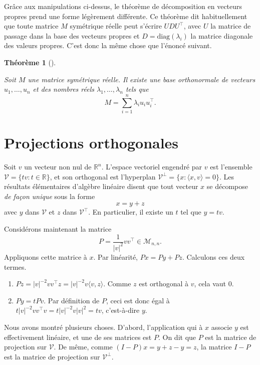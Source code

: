 \documentclass[
  10,
  letterpaper,
  DIV=11,
  numbers=noendperiod]{scrreport}
\providecommand{\tightlist}{%
  \setlength{\itemsep}{0pt}\setlength{\parskip}{0pt}}\usepackage{longtable,booktabs,array}
\theoremstyle{plain}
\newtheorem{theorem}{Théorème}[chapter]
\theoremstyle{definition}
\theoremstyle{plain}
\theoremstyle{definition}
\theoremstyle{definition}
\theoremstyle{plain}
\theoremstyle{remark}
\begin{document}
Grâce aux manipulations ci-dessus, le théorème de décomposition en
vecteurs propres prend une forme légèrement différente. Ce théorème dit
habituellement que toute matrice \(M\) symétrique réelle peut s'écrire
\(UDU^\top\), avec \(U\) la matrice de passage dans la base des vecteurs
propres et \(D = \mathrm{diag}(\lambda_i)\) la matrice diagonale des
valeurs propres. C'est donc la même chose que l'énoncé suivant.

\begin{theorem}[]\protect\hypertarget{thm-spectral}{}\label{thm-spectral}

Soit \(M\) une matrice symétrique réelle. Il existe une base
orthonormale de vecteurs \(u_1, \dotsc, u_n\) et des nombres réels
\(\lambda_1, \dotsc , \lambda_n\) tels que
\[ M = \sum_{i=1}^n \lambda_i u_i u_i^\top.\]

\end{theorem}

\hypertarget{projections-orthogonales}{%
\section{Projections orthogonales}\label{projections-orthogonales}}

Soit \(v\) un vecteur non nul de \(\mathbb{R}^n\). L'espace vectoriel
engendré par \(v\) est l'ensemble
\(\mathscr{V}=\{tv : t \in \mathbb{R}\}\), et son orthogonal est
l'hyperplan \(\mathscr{V}^\perp = \{x : \langle x, v \rangle = 0\}\).
Les résultats élémentaires d'algèbre linéaire disent que tout vecteur
\(x\) se décompose \emph{de façon unique} sous la forme \[ x = y + z\]
avec \(y\) dans \(\mathscr{V}\) et \(z\) dans \(\mathscr{V}^\top\). En
particulier, il existe un \(t\) tel que \(y = tv\).

Considérons maintenant la matrice
\[P = \frac{1}{|v|^2}vv^\top \in \mathscr{M}_{n,n}. \] Appliquons cette
matrice à \(x\). Par linéarité, \(Px = Py + Pz\). Calculons ces deux
termes.

\begin{enumerate}
\def\labelenumi{\arabic{enumi}.}
\tightlist
\item
  \(Pz = |v|^{-2}v v^\top z = |v|^{-2}v \langle v, z\rangle\). Comme
  \(z\) est orthogonal à \(v\), cela vaut 0.
\item
  \(Py = tPv\). Par définition de \(P\), ceci est donc égal à
  \(t|v|^{-2}v v^\top v = t|v|^{-2}v |v|^2 = tv\), c'est-à-dire \(y\).
\end{enumerate}

Nous avons montré plusieurs choses. D'abord, l'application qui à \(x\)
associe \(y\) est effectivement linéaire, et une de ses matrices est
\(P\). On dit que \(P\) est la matrice de projection sur
\(\mathscr{V}\). De même, comme \((I - P)x = y+z - y = z\), la matrice
\(I-P\) est la matrice de projection sur \(\mathscr{V}^\perp\).
\end{document}
